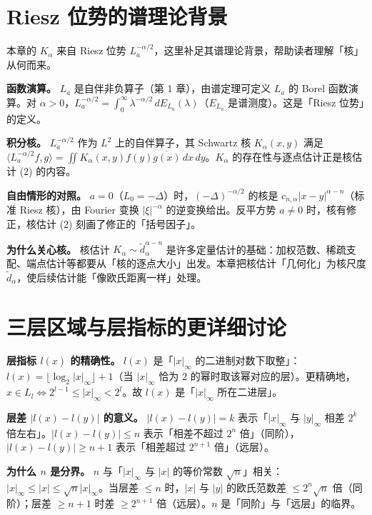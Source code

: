 \documentclass[a4paper,11pt,openany]{ctexbook}
\numberwithin{equation}{chapter}
\numberwithin{figure}{chapter}
\numberwithin{table}{chapter}
\begin{document}
\section{Riesz 位势的谱理论背景}

本章的 $K_\alpha$ 来自 Riesz 位势 $L_a^{-\alpha/2}$，这里补足其谱理论背景，帮助读者理解「核」从何而来。

\textbf{函数演算。} $L_a$ 是自伴非负算子（第 1 章），由谱定理可定义 $L_a$ 的 Borel 函数演算。对 $\alpha>0$，$L_a^{-\alpha/2}=\int_0^\infty\lambda^{-\alpha/2}\,dE_{L_a}(\lambda)$（$E_{L_a}$ 是谱测度）。这是「Riesz 位势」的定义。

\textbf{积分核。} $L_a^{-\alpha/2}$ 作为 $L^2$ 上的自伴算子，其 Schwartz 核 $K_\alpha(x,y)$ 满足 $\langle L_a^{-\alpha/2}f,g\rangle=\iint K_\alpha(x,y)f(y)\overline{g(x)}\,dx\,dy$。$K_\alpha$ 的存在性与逐点估计正是核估计 (2) 的内容。

\textbf{自由情形的对照。} $a=0$（$L_0=-\Delta$）时，$(-\Delta)^{-\alpha/2}$ 的核是 $c_{n,\alpha}|x-y|^{\alpha-n}$（标准 Riesz 核），由 Fourier 变换 $|\xi|^{-\alpha}$ 的逆变换给出。反平方势 $a\neq0$ 时，核有修正，核估计 (2) 刻画了修正的「括号因子」。

\textbf{为什么关心核。} 核估计 $K_\alpha\sim\widetilde d_\alpha^{\alpha-n}$ 是许多定量估计的基础：加权范数、稀疏支配、端点估计等都要从「核的逐点大小」出发。本章把核估计「几何化」为核尺度 $\widetilde d_\alpha$，使后续估计能「像欧氏距离一样」处理。

\section{三层区域与层指标的更详细讨论}

\textbf{层指标 $l(x)$ 的精确性。} $l(x)$ 是「$|x|_\infty$ 的二进制对数下取整」：$l(x)=\lfloor\log_2|x|_\infty\rfloor+1$（当 $|x|_\infty$ 恰为 $2$ 的幂时取该幂对应的层）。更精确地，$x\in L_l\iff 2^{l-1}\le|x|_\infty<2^l$。故 $l(x)$ 是「$|x|_\infty$ 所在二进层」。

\textbf{层差 $|l(x)-l(y)|$ 的意义。} $|l(x)-l(y)|=k$ 表示「$|x|_\infty$ 与 $|y|_\infty$ 相差 $2^k$ 倍左右」。$|l(x)-l(y)|\le n$ 表示「相差不超过 $2^n$ 倍」（同阶），$|l(x)-l(y)|\ge n+1$ 表示「相差超过 $2^{n+1}$ 倍」（远层）。

\textbf{为什么 $n$ 是分界。} $n$ 与「$|x|_\infty$ 与 $|x|$ 的等价常数 $\sqrt n$」相关：$|x|_\infty\le|x|\le\sqrt n|x|_\infty$。当层差 $\le n$ 时，$|x|$ 与 $|y|$ 的欧氏范数差 $\le2^n\sqrt n$ 倍（同阶）；层差 $\ge n+1$ 时差 $\ge2^{n+1}$ 倍（远层）。$n$ 是「同阶」与「远层」的临界。
\end{document}
